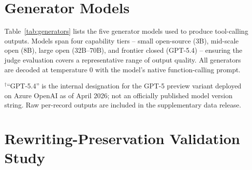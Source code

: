 \section{Generator Models}
\label{app:generators}

Table~\ref{tab:generators} lists the five generator models used to produce tool-calling outputs. Models span four capability tiers -- small open-source (3B), mid-scale open (8B), large open (32B--70B), and frontier closed (GPT-5.4) -- ensuring the judge evaluation covers a representative range of output quality. All generators are decoded at temperature $0$ with the model's native function-calling prompt.

\begin{table}[!htbp]
\centering
\small
\renewcommand{\arraystretch}{1.1}
\setlength{\tabcolsep}{5pt}
\begin{flushleft}
\footnotesize $^{\dagger}$``GPT-5.4'' is the internal designation for the GPT-5 preview variant deployed on Azure OpenAI as of April 2026; not an officially published model version string. Raw per-record outputs are included in the supplementary data release.
\end{flushleft}
\caption{Generator models used to produce tool-calling outputs. All generators use temperature $=0$ with their native function-calling prompt.}
\label{tab:generators}

\end{table}

\section{Rewriting-Preservation Validation Study}
\label{app:rewrite-validation}

